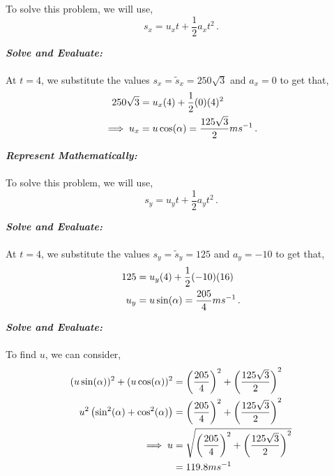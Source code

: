 \begin{subquestions}
\begin{subsubquestions}
To solve this problem, we will use,
\begin{equation}
	s_x = u_xt + \frac{1}{2}a_xt^2 \,.
\end{equation}




\textbf{\textit{Solve and Evaluate:}} \\ \\
At $t=4$, we substitute the values $s_x=\tilde{s}_x=250\sqrt{3}$ and $a_x=0$ to get that,
\begin{align}
	250\sqrt{3} & = u_x(4) + \frac{1}{2}(0)(4)^2 \nonumber \\
	\implies u_x & = u\cos(\alpha) = \frac{125\sqrt{3}}{2}ms^{-1} \,.
\end{align} 


\subsubquestion

\textbf{\textit{Represent Mathematically:}} \\ \\
To solve this problem, we will use,
\begin{equation}
	s_y = u_yt + \frac{1}{2}a_yt^2 \,.
\end{equation}




\textbf{\textit{Solve and Evaluate:}} \\ \\
At $t=4$, we substitute the values $s_y=\tilde{s}_y=125$ and $a_y=-10$ to get that,
\begin{align}
	125 & = u_y(4) + \frac{1}{2}(-10)(16) \nonumber \\
	u_y & = u\sin(\alpha) = \frac{205}{4}ms^{-1} \,.
\end{align}


\subsubquestion

\textbf{\textit{Solve and Evaluate:}} \\ \\
To find $u$, we can consider,
\begin{align}
	(u\sin(\alpha))^2 + (u\cos(\alpha))^2 & = \left(\frac{205}{4}\right)^2 + \left(\frac{125\sqrt{3}}{2}\right)^2 \nonumber \\
	 u^2\left(\sin^2(\alpha)+\cos^2(\alpha)\right) & = \left(\frac{205}{4}\right)^2 + \left(\frac{125\sqrt{3}}{2}\right)^2 \nonumber \\
	 \implies u & = \sqrt{\left(\frac{205}{4}\right)^2 + \left(\frac{125\sqrt{3}}{2}\right)^2} \nonumber \\
	            & = 119.8ms^{-1}
\end{align}


\end{subsubquestions}
\end{subquestions}
